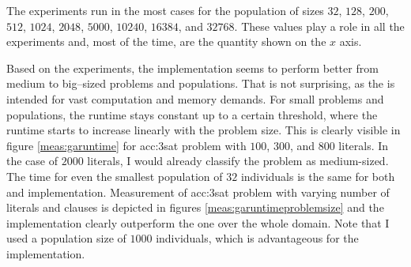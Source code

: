 The experiments run in the most cases for the population of sizes $32$, $128$, $200$, $512$, $1024$, $2048$, $5000$, $10240$, $16384$, and $32768$. These values play a role in all the experiments and, most of the time, are the quantity shown on the $x$ axis.

Based on the experiments, the \cuda implementation seems to perform better from medium to big--sized problems and populations. That is not surprising, as the \gpu is intended for vast computation and memory demands. For small problems and populations, the runtime stays constant up to a certain threshold, where the runtime starts to increase linearly with the problem size. This is clearly visible in figure \ref{meas:garuntime} for \acrshort{acc:3sat} problem with $100$, $300$, and $800$ literals. In the case of $2000$ literals, I would already classify the problem as medium-sized. The time for even the smallest population of $32$ individuals is the same for both \cpu and \gpu implementation. Measurement of \acrshort{acc:3sat} problem with varying number of literals and clauses is depicted in figures \ref{meas:garuntimeproblemsize} and the \gpu implementation clearly outperform the \cpu one over the whole domain. Note that I used a population size of $1000$ individuals, which is advantageous for the \gpu implementation.

